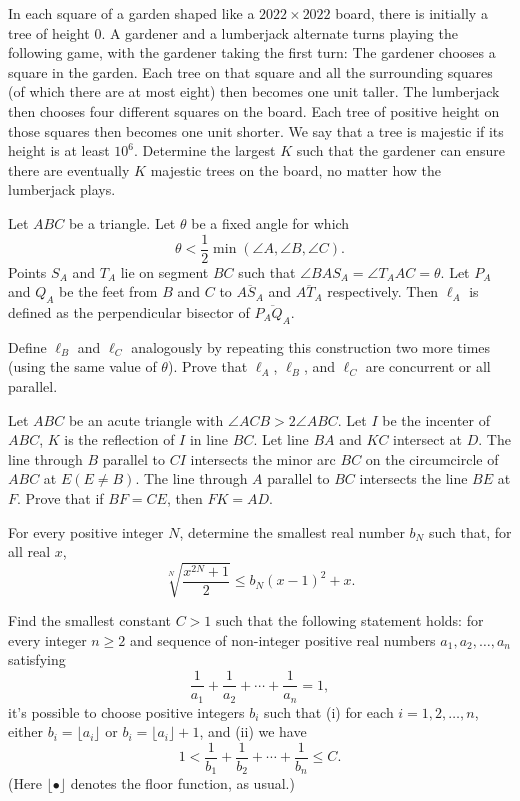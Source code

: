 \documentclass[11pt]{scrartcl}
\begin{document}
\begin{problem}[8799177804774743019]
In each square of a garden shaped like a $2022 \times 2022$ board, there is initially a tree of height $0$. A gardener and a lumberjack alternate turns playing the following game, with the gardener taking the first turn:
The gardener chooses a square in the garden. Each tree on that square and all the surrounding squares (of which there are at most eight) then becomes one unit taller.
The lumberjack then chooses four different squares on the board. Each tree of positive height on those squares then becomes one unit shorter.
We say that a tree is majestic if its height is at least $10^6$. Determine the largest $K$ such that the gardener can ensure there are eventually $K$ majestic trees on the board, no matter how the lumberjack plays.
\end{problem}
\begin{problem}[23047452603115]
Let $ABC$ be a triangle. Let $\theta$ be a fixed angle for which\[\theta<\frac12\min(\angle A,\angle B,\angle C).\]Points $S_A$ and $T_A$ lie on segment $BC$ such that $\angle BAS_A=\angle T_AAC=\theta$. Let $P_A$ and $Q_A$ be the feet from $B$ and $C$ to $\overline{AS_A}$ and $\overline{AT_A}$ respectively. Then $\ell_A$ is defined as the perpendicular bisector of $\overline{P_AQ_A}$.

Define $\ell_B$ and $\ell_C$ analogously by repeating this construction two more times (using the same value of $\theta$). Prove that $\ell_A$, $\ell_B$, and $\ell_C$ are concurrent or all parallel.
\end{problem}
\begin{problem}[156060759856343521]
Let $ABC$ be an acute triangle with $\angle ACB>2 \angle ABC$. Let $I$ be the incenter of $ABC$, $K$ is the reflection of $I$ in line $BC$. Let line $BA$ and $KC$ intersect at $D$. The line through $B$ parallel to $CI$ intersects the minor arc $BC$ on the circumcircle of $ABC$ at $E(E \neq B)$. The line through $A$ parallel to $BC$ intersects the line $BE$ at $F$.
Prove that if $BF=CE$, then $FK=AD$.
\end{problem}
\begin{problem}[7500559455615129254]
For every positive integer $N$, determine the smallest real number $b_{N}$ such that, for all real $x$,
\[
\sqrt[N]{\frac{x^{2 N}+1}{2}} \leqslant b_{N}(x-1)^{2}+x .
\]
\end{problem}
\begin{problem}[7229423492681245326]
Find the smallest constant $C > 1$ such that the following statement holds: for every integer $n \geq 2$ and sequence of non-integer positive real numbers $a_1, a_2, \dots, a_n$ satisfying$$\frac{1}{a_1} + \frac{1}{a_2} + \cdots + \frac{1}{a_n} = 1,$$it's possible to choose positive integers $b_i$ such that
(i) for each $i = 1, 2, \dots, n$, either $b_i = \lfloor a_i \rfloor$ or $b_i = \lfloor a_i \rfloor + 1$, and
(ii) we have$$1 < \frac{1}{b_1} + \frac{1}{b_2} + \cdots + \frac{1}{b_n} \leq C.$$(Here $\lfloor \bullet \rfloor$ denotes the floor function, as usual.)
\end{problem}
\end{document}
